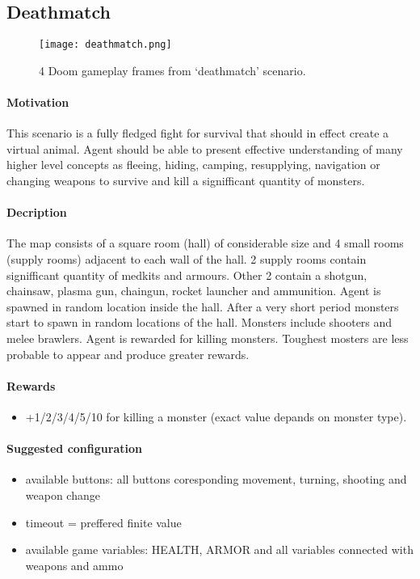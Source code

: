 	\subsection{Deathmatch}
		\begin{figure}
			\centering
			\texttt{[image: deathmatch.png]}
			\caption{4 Doom gameplay frames from `deathmatch' scenario.}\label{fig:deatchmatch}
		\end{figure}
		\paragraph{Motivation} 
	 		This scenario is a fully fledged fight for survival that should in effect create a virtual animal. Agent should be able to present effective understanding of many higher level concepts as fleeing, hiding, camping, resupplying, navigation or changing weapons to survive and kill a signifficant quantity of monsters.

		\paragraph{Decription}
			The map consists of a square room (hall) of considerable size and 4 small rooms (supply rooms) adjacent to each wall of the hall. 2 supply rooms contain signifficant quantity of medkits and armours. Other 2 contain a shotgun, chainsaw, plasma gun, chaingun, rocket launcher and ammunition. Agent is spawned in random location inside the hall. After a very short period monsters start to spawn in random locations of the hall. Monsters include shooters and melee brawlers. Agent is rewarded for killing monsters. Toughest mosters are less probable to appear and produce greater rewards.
		\paragraph{Rewards}
			\begin{itemize}
				\item +1/2/3/4/5/10 for killing a monster (exact value depands on monster type).
			\end{itemize}
		
		\paragraph{Suggested configuration}
			\begin{itemize}
				\item available buttons: all buttons coresponding movement, turning, shooting and weapon change 
				\item timeout = preffered finite value
				\item available game variables: HEALTH, ARMOR and all variables connected with weapons and ammo
			\end{itemize}		
	\newpage


